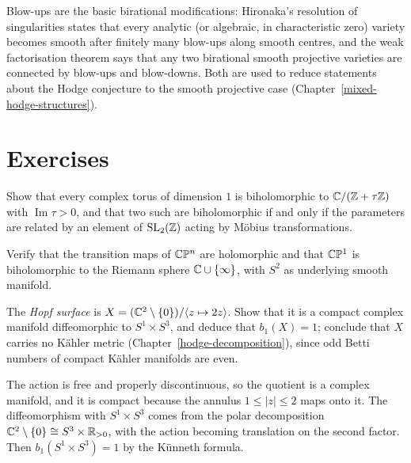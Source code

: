 \begin{remark}\label{complex-manifolds:remark-blowup-birational}
Blow-ups are the basic birational modifications: Hironaka's resolution of singularities states that every analytic (or algebraic, in characteristic zero) variety becomes smooth after finitely many blow-ups
along smooth centres, and the weak factorisation theorem says that any two birational smooth projective varieties are connected by blow-ups and blow-downs. Both are used to reduce statements about the Hodge
conjecture to the smooth projective case (Chapter~\ref{mixed-hodge-structures}).
\end{remark}

\section{Exercises}\label{complex-manifolds:section-exercises}

\begin{exercise}\label{complex-manifolds:exercise-tori}
Show that every complex torus of dimension $1$ is biholomorphic to $\mathbb{C}/(\mathbb{Z} + \tau\mathbb{Z})$ with $\operatorname{Im}\tau > 0$, and that two such are biholomorphic if and only if the parameters are related by
an element of $\mathrm{SL}_2(\mathbb{Z})$ acting by M\"obius transformations.
\end{exercise}

\begin{exercise}\label{complex-manifolds:exercise-projective-space-charts}
Verify that the transition maps of $\mathbb{C}\mathbb{P}^n$ are holomorphic and that $\mathbb{C}\mathbb{P}^1$ is biholomorphic to the Riemann sphere $\mathbb{C} \cup \{\infty\}$, with $S^2$ as underlying smooth manifold.
\end{exercise}

\begin{exercise}\label{complex-manifolds:exercise-hopf-surface}
The \emph{Hopf surface} is $X = (\mathbb{C}^2 \setminus \{0\})/\langle z \mapsto 2z\rangle$. Show that it is a compact complex manifold diffeomorphic to $S^1 \times S^3$, and deduce that $b_1(X) = 1$; conclude that $X$
carries no K\"ahler metric (Chapter~\ref{hodge-decomposition}), since odd Betti numbers of compact K\"ahler manifolds are even.
\end{exercise}

\begin{solution}
The action is free and properly discontinuous, so the quotient is a complex manifold, and it is compact because the annulus $1 \leq |z| \leq 2$ maps onto it. The diffeomorphism with $S^1 \times S^3$ comes from
the polar decomposition $\mathbb{C}^2 \setminus \{0\} \cong S^3 \times \mathbb{R}_{>0}$, with the action becoming translation on the second factor. Then $b_1(S^1 \times S^3) = 1$ by the K\"unneth formula.
\end{solution}

